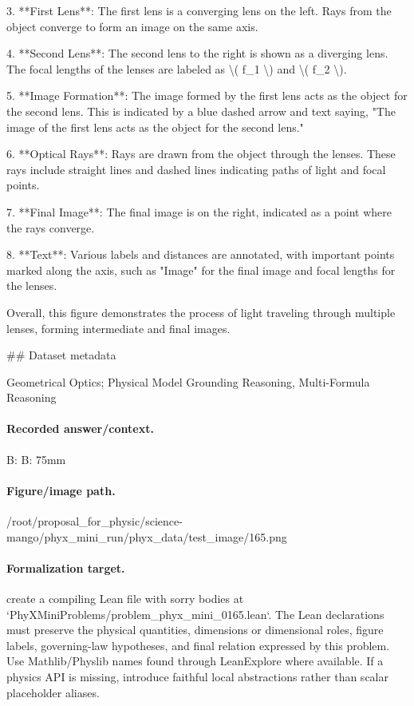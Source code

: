 3. **First Lens**: The first lens is a converging lens on the left. Rays from the object converge to form an image on the same axis.

4. **Second Lens**: The second lens to the right is shown as a diverging lens. The focal lengths of the lenses are labeled as \textbackslash{}( f\_1 \textbackslash{}) and \textbackslash{}( f\_2 \textbackslash{}).

5. **Image Formation**: The image formed by the first lens acts as the object for the second lens. This is indicated by a blue dashed arrow and text saying, "The image of the first lens acts as the object for the second lens."

6. **Optical Rays**: Rays are drawn from the object through the lenses. These rays include straight lines and dashed lines indicating paths of light and focal points.

7. **Final Image**: The final image is on the right, indicated as a point where the rays converge.

8. **Text**: Various labels and distances are annotated, with important points marked along the axis, such as "Image" for the final image and focal lengths for the lenses.

Overall, this figure demonstrates the process of light traveling through multiple lenses, forming intermediate and final images.

\#\# Dataset metadata

Geometrical Optics; Physical Model Grounding Reasoning, Multi-Formula Reasoning

\paragraph{Recorded answer/context.}
B: B: 75mm

\paragraph{Figure/image path.}
/root/proposal\_for\_physic/science-mango/phyx\_mini\_run/phyx\_data/test\_image/165.png

\paragraph{Formalization target.}
create a compiling Lean file with sorry bodies at `PhyXMiniProblems/problem\_phyx\_mini\_0165.lean`. The Lean declarations must preserve the physical quantities, dimensions or dimensional roles, figure labels, governing-law hypotheses, and final relation expressed by this problem.
Use Mathlib/Physlib names found through LeanExplore where available. If a physics API is missing, introduce faithful local abstractions rather than scalar placeholder aliases.

